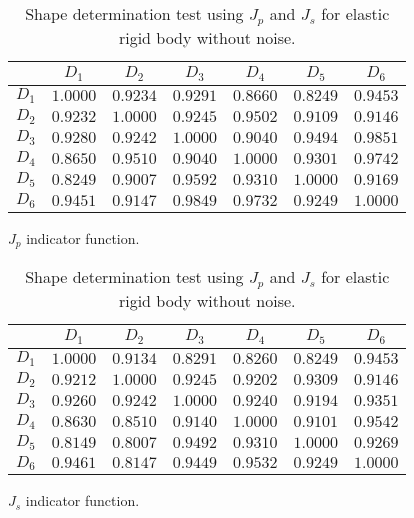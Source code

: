 \documentclass[a4paper,11pt]{article}
\theoremstyle{remark}
\theoremstyle{definition}
\numberwithin{equation}{section}
\begin{document}
\begin{table}
\hfill{}%
\begin{tabular}{|c|c|c|c|c|c|c|}
\hline
 & $D_{1}$ & $D_{2}$ & $D_{3}$ & $D_{4}$ & $D_{5}$ & $D_{6}$\tabularnewline
\hline
\hline
$D_{1}$ & $\boldsymbol{1.0000}$ & $0.9234$ & $0.9291$ & $0.8660$ & $0.8249$ & $0.9453$\tabularnewline
\hline
$D_{2}$ & $0.9232$ & $\boldsymbol{1.0000}$ & $0.9245$ & $0.9502$ & $0.9109$ & $0.9146$\tabularnewline
\hline
$D_{3}$ & $0.9280$ & $0.9242$ & $\boldsymbol{1.0000}$ & $0.9040$ & $0.9494$ & $0.9851$\tabularnewline
\hline
$D_{4}$ & $0.8650$ & $0.9510$ & $0.9040$ & $\boldsymbol{1.0000}$ & $0.9301$ & $0.9742$\tabularnewline
\hline
$D_{5}$ & $0.8249$ & $0.9007$ & $0.9592$ & $0.9310$ & $\boldsymbol{1.0000}$ & $0.9169$\tabularnewline
\hline
$D_{6}$ & $0.9451$ & $0.9147$ & $0.9849$ & $0.9732$ & $0.9249$ & $\boldsymbol{1.0000}$\tabularnewline
\hline
\end{tabular}\hfill{}

\smallskip

\hfill{}$J_{p} $  indicator function.\hfill{}

\medskip

\hfill{}%
\begin{tabular}{|c|c|c|c|c|c|c|}
\hline
 & $D_{1}$ & $D_{2}$ & $D_{3}$ & $D_{4}$ & $D_{5}$ & $D_{6}$\tabularnewline
\hline
\hline
$D_{1}$ & $\boldsymbol{1.0000}$ & $0.9134$ & $0.8291$ & $0.8260$ & $0.8249$ & $0.9453$\tabularnewline
\hline
$D_{2}$ & $0.9212$ & $\boldsymbol{1.0000}$ & $0.9245$ & $0.9202$ & $0.9309$ & $0.9146$\tabularnewline
\hline
$D_{3}$ & $0.9260$ & $0.9242$ & $\boldsymbol{1.0000}$ & $0.9240$ & $0.9194$ & $0.9351$\tabularnewline
\hline
$D_{4}$ & $0.8630$ & $0.8510$ & $0.9140$ & $\boldsymbol{1.0000}$ & $0.9101$ & $0.9542$\tabularnewline
\hline
$D_{5}$ & $0.8149$ & $0.8007$ & $0.9492$ & $0.9310$ & $\boldsymbol{1.0000}$ & $0.9269$\tabularnewline
\hline
$D_{6}$ & $0.9461$ & $0.8147$ & $0.9449$ & $0.9532$ & $0.9249$ & $\boldsymbol{1.0000}$\tabularnewline
\hline
\end{tabular}\hfill{}

\smallskip


\hfill{}$J_{s}$  indicator function. \hfill{}

\caption{\label{tab:gesture-test-pec}Shape determination test using $J_{p}$ and $J_{s}$  for elastic rigid body without noise.}
\end{table}
\end{document}
